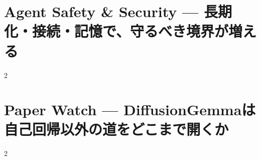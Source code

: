 \documentclass[lualatex,a4paper,11pt]{jlreq}
\begin{document}
\Needspace{0.45\textheight}
\bigskip
\section{Agent Safety \& Security — 長期化・接続・記憶で、守るべき境界が増える}
\label{pkg:agent-safety-security-july}
\vspace{0.15em}
\begin{multicols}{2}

\end{multicols}
\Needspace{0.34\textheight}

\medskip


\Needspace{0.45\textheight}
\bigskip
\section{Paper Watch — DiffusionGemmaは自己回帰以外の道をどこまで開くか}
\label{pkg:paper-watch-july}
\vspace{0.15em}
\begin{multicols}{2}

\end{multicols}


\Needspace{0.55\textheight}
\bigskip

\bigskip
\printbibliography[title={References / Source Notes}]
\end{document}
